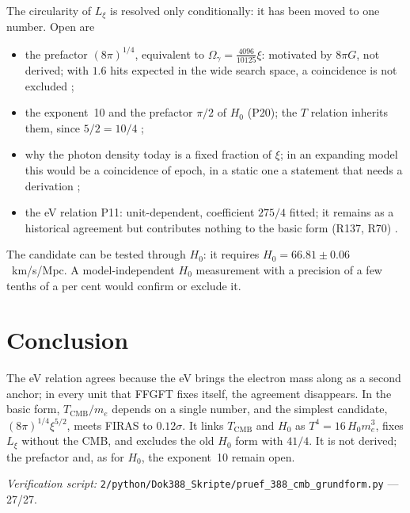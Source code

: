 The circularity of $L_\xi$ is resolved only conditionally: it has been moved to one number. Open
are
\begin{itemize}
\item the prefactor $(8\pi)^{1/4}$, equivalent to $\Omega_\gamma=\frac{4096}{10125}\xi$:
motivated by $8\pi G$, not derived; with $1.6$ hits expected in the wide search space, a
coincidence is not excluded \SM;
\item the exponent~10 and the prefactor $\pi/2$ of $H_0$ (P20); the $T$ relation inherits them,
since $5/2=10/4$ \SM;
\item why the photon density today is a fixed fraction of $\xi$; in an expanding model this would
be a coincidence of epoch, in a static one a statement that needs a derivation \SM;
\item the eV relation P11: unit-dependent, coefficient $275/4$ fitted; it remains as a historical
agreement but contributes nothing to the basic form (R137, R70) \SM.
\end{itemize}
The candidate can be tested through $H_0$: it requires $H_0=66.81\pm0.06$~km/s/Mpc. A
model-independent $H_0$ measurement with a precision of a few tenths of a per cent would confirm
or exclude it.

\section{Conclusion}

The eV relation agrees because the eV brings the electron mass along as a second anchor; in every
unit that FFGFT fixes itself, the agreement disappears. In the basic form,
$T_{\mathrm{CMB}}/m_e$ depends on a single number, and the simplest candidate,
$(8\pi)^{1/4}\xi^{5/2}$, meets FIRAS to $0.12\sigma$. It links $T_{\mathrm{CMB}}$ and $H_0$ as
$T^4=16\,H_0m_e^3$, fixes $L_\xi$ without the CMB, and excludes the old $H_0$ form with $41/4$.
It is not derived; the prefactor and, as for $H_0$, the exponent~10 remain open.

\vspace{1em}
\noindent\textit{Verification script:} \texttt{2/python/Dok388\_Skripte/pruef\_388\_cmb\_grundform.py}
--- 27/27.
